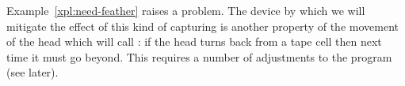 \documentclass[11pt]{memoir}
\theoremstyle{definition} %
\newcommand{\Q}{Q} %
\begin{document}


Example~\ref{xpl:need-feather} raises a problem.
The device by which we will mitigate the effect of this kind of capturing is another property of the
movement of the head which will call :
if the head turns back from a tape cell then next time it must go beyond.
This requires a number of adjustments to the program (see later).

  
\end{document}
